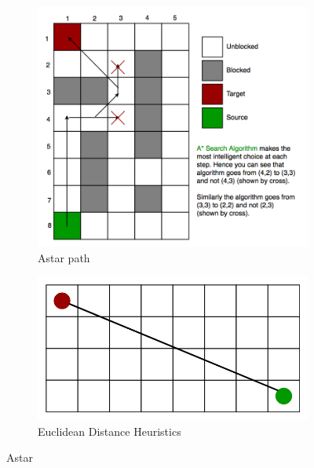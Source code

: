 \documentclass[bibliography=totoc]{scrartcl}
\begin{document}
\begin{figure}[H]
	\centering
	\begin{subfigure}[b]{0.3\linewidth}
		\includegraphics[width=\linewidth]{img/a_-search-algorithm.png}
        \caption{Astar path}
        \label{fig:astar_path}
        	
    \end{subfigure}
	\hspace{0.02\textwidth}
	\begin{subfigure}[b]{0.3\linewidth}
		\includegraphics[width=\linewidth]{img/a_-search-algorithm-euclidian_distance.png}
		\caption{Euclidean Distance Heuristics}
        \label{fig:EuclideanDistanceHeuristics}
	\end{subfigure}
 	\caption{Astar \cite{Pic:astar}}
	\label{fig:astar}
\end{figure}
\end{document}
